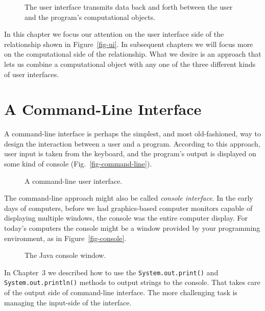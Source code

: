\begin{figure}[h]
{The user interface transmits data back and forth between the user
and the program's computational objects.
\label{fig-ui}
\label{pg-fig-ui}}
\end{figure}

In this chapter we focus our attention on the user interface side of
the relationship shown in Figure~\ref{fig-ui}. In subsequent chapters
we will focus more on the computational side of the relationship. What
we desire is an approach that lets us combine a computational object
with any one of the three different kinds of user interfaces.


\section{A Command-Line Interface}

A command-line interface is perhaps the simplest, and most
old-fashioned, way to design the interaction between a user and a
program. According to this approach, user input is taken from the
keyboard, and the program's output is displayed on some kind of
console (Fig.~\ref{fig-command-line}).

\begin{figure}[h]
{A command-line user interface.
\label{fig-command-line}
\label{pg-fig-command-line}}
\end{figure}

The command-line approach might also be called {\em console
interface}. In the early days of computers, before we had
graphics-based computer monitors capable of displaying multiple
windows, the console was the entire computer display. For today's
computers the console might be a window provided by your programming
environment, as in Figure~\ref{fig-console}.

\begin{figure}[h]
{The Java console window.
\label{fig-console}
\label{pg-fig-console}}
\end{figure}

In Chapter~3 we described how to use the {\tt System.out.print()} and
{\tt System.out.println()} methods to output strings to the console.
That takes care of the output side of command-line interface. The more
challenging task is managing the input-side of the interface.

